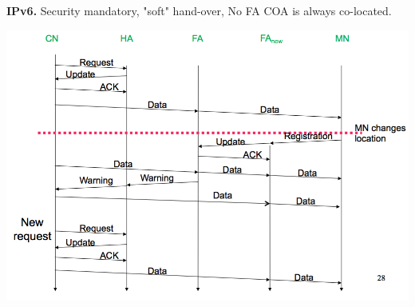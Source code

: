 \documentclass[10pt,twocolumn]{article}
\renewcommand{\bf}{\textbf}
\begin{document}
\bf{IPv6.} Security mandatory, "soft" hand-over, No FA COA is always co-located.

\includegraphics[width=\linewidth]{figures/mobile-ip-handover.png}
\end{document}
